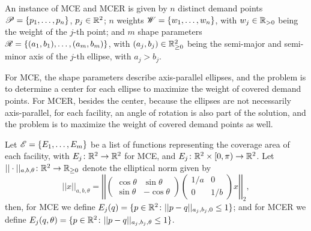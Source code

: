 


An instance of MCE and MCER is given by $n$ distinct demand points $\mathscr{P}=\{p_1, \dots, p_n\}$, $p_j\in\mathbb{R}^2$; $n$ weights $\mathscr{W}=\{w_1, \dots, w_n\}$, with $w_j\in\mathbb{R}_{>0}$ being the weight of the $j$-th point; and $m$ shape parameters $\mathscr{R}=\{(a_1, b_1), \dots, (a_m, b_m)\}$, with $(a_j, b_j)\in\mathbb{R}_{\ge0}^2$ being the semi-major and semi-minor axis of the $j$-th ellipse, with $a_j > b_j$.

For MCE, the shape parameters describe axis-parallel ellipses, and the problem is to determine a center for each ellipse to maximize the weight of covered demand points. For MCER, besides the center, because the ellipses are not necessarily axis-parallel, for each facility, an angle of rotation is also part of the solution, and the problem is to maximize the weight of covered demand points as well.

Let $\mathscr{E}=\{E_1, \dots, E_m\}$ be a list of functions representing the coverage area of each facility, with $E_j \colon \mathbb{R}^2 \to \mathbb{R}^2$ for MCE, and $E_j \colon \mathbb{R}^2\times [0, \pi)\to \mathbb{R}^2$. Let $||\cdot||_{a,b, \theta} \colon \mathbb{R}^2 \to \mathbb{R}_{\ge0}$ denote the elliptical norm given by
\begin{equation*}
||x||_{a,b, \theta}=\left|\left|
\left(\begin{array}{rr}
\cos{\theta} & \sin{\theta}\\
\sin{\theta} & -\cos{\theta}
\end{array}
\right)
\left(\begin{array}{cc}
1/a & 0\\
0 & 1/b
\end{array}\right) x \right|\right|_2,
\end{equation*}
then, for MCE we define $E_j(q)=\{p \in \mathbb{R}^2 \colon ||p-q||_{a_j,b_j,0} \le 1\}$; and for MCER we define $E_j(q, \theta)=\{p \in \mathbb{R}^2 \colon ||p-q||_{a_j,b_j, \theta} \le 1\}$.

